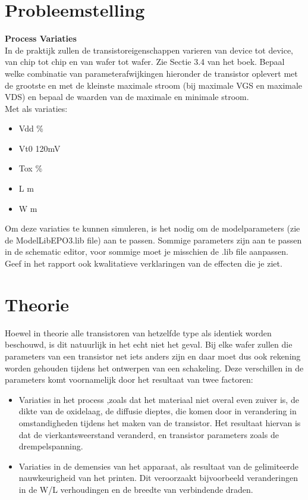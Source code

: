 \documentclass{article}
\begin{document}
\section{Probleemstelling}
\textbf{Process Variaties}\\
In de praktijk zullen de transistoreigenschappen varieren van device tot device, van chip tot chip en van 
wafer tot wafer. Zie Sectie 3.4 van het boek. Bepaal welke combinatie van parameterafwijkingen hieronder
de transistor oplevert met de grootste en met de kleinste maximale stroom (bij maximale VGS en maximale
VDS) en bepaal de waarden van de maximale en minimale stroom.\\
Met als variaties:
\newline
\begin {itemize}
	\item Vdd \%
	\item Vt0  \pm 120mV
	\item Tox \%
	\item L \textmu m
	\item W \textmu m
\end {itemize}

Om deze variaties te kunnen simuleren, is het nodig om de modelparameters (zie de ModelLibEPO3.lib
ﬁle) aan te passen. Sommige parameters zijn aan te passen in de schematic editor, voor sommige moet je
misschien de .lib ﬁle aanpassen. Geef in het rapport ook kwalitatieve verklaringen van de effecten die je
ziet.

\section{Theorie}

Hoewel in theorie alle transistoren van hetzelfde type als identiek worden beschouwd, is dit natuurlijk in het echt niet het geval. 
Bij elke wafer zullen die parameters van een transistor net iets anders zijn en daar moet dus ook rekening worden gehouden tijdens het ontwerpen van een schakeling. Deze verschillen in de parameters komt voornamelijk door het resultaat van twee factoren:
\newline
\begin {itemize}
	\item Variaties in het process ,zoals dat het materiaal niet overal even zuiver is, de dikte van de oxidelaag, de diffusie dieptes, die komen door in verandering in omstandigheden tijdens het maken van de transistor. Het resultaat hiervan is dat de vierkantsweerstand veranderd, en transistor parameters zoals de drempelspanning.
	\item Variaties in de demensies van het apparaat, als resultaat van de gelimiteerde nauwkeurigheid van het printen. Dit veroorzaakt bijvoorbeeld veranderingen in de W/L verhoudingen en de breedte van verbindende draden.
\end {itemize}
\end{document}
